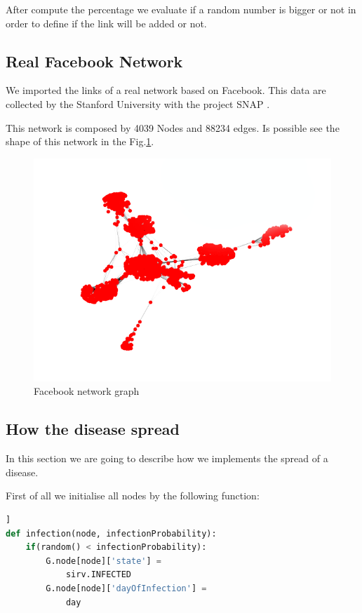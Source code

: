         After compute the percentage we evaluate if a random number is bigger or not in order to define if the link will be added or not.
        
    \subsection{Real Facebook Network}
        We imported the links of a real network based on Facebook. This data are collected by the Stanford University with the project SNAP \cite{stanford_Facebook}.
        
        This network is composed by 4039 Nodes and 88234 edges. Is possible see the shape of this network in the Fig.\ref{fig:Facebook}.
        \begin{figure}[t]
            \centering
            \includegraphics[width=\linewidth]{Figure/FacebookGraph.png}
            \caption{Facebook network graph}
            \label{fig:Facebook}
        \end{figure}
        
    \subsection{How the disease spread}
        In this section we are going to describe how we implements the spread of a disease.
        
        First of all we initialise all nodes by the following function: 
        
        \begin{lstlisting}[language=Python, frame=single]]
def infection(node, infectionProbability):
    if(random() < infectionProbability):
        G.node[node]['state'] = 
            sirv.INFECTED
        G.node[node]['dayOfInfection'] = 
            day
        \end{lstlisting}
        
